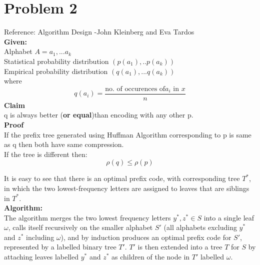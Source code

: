 \documentclass[paper=a4, fontsize=11pt]{scrartcl} %
\numberwithin{equation}{section} %
\numberwithin{figure}{section} %
\numberwithin{table}{section} %
\begin{document}
\section{Problem 2}
Reference: Algorithm Design -John Kleinberg and Eva Tardos\\
\textbf{Given:}\\
Alphabet $A={a_1,...a_k}$\\
Statistical probability distribution $(p(a_1),..p(a_k))$\\
Empirical probability distribution $(q(a_1), ... q(a_k))$\\
where
\begin{equation}
	q(a_i) = \frac{\text{no. of occurences of} a_i \text{ in } x}{n}
\end{equation}
\textbf{Claim}\\
q is always better (\textbf{or equal})than encoding with any other p. \\
\textbf{Proof}\\
If the prefix tree generated using Huffman Algorithm corresponding to p is same as q then both have same compression. \\
If the tree is different then: \\
\begin{equation}
	\rho(q) \leq \rho(p)
\end{equation}

It is easy to see that there is an optimal prefix code, with corresponding tree $T^*$, in which the two lowest-frequency letters are assigned to leaves that are siblings in $T^*$. \\
\textbf{Algorithm:}\\
The algorithm merges the two lowest frequency letters $y^*, z^* \in S$ into a single leaf $\omega$, calls itself recursively on the smaller alphabet $S'$ (all alphabets excluding $y^*$ and $z^*$ including $\omega$), and by induction produces an optimal prefix code for $S'$, represented by a labelled binary tree $T'$. $T'$ is then extended into a tree $T$ for $S$ by attaching leaves labelled $y^*$ and $z^*$ as children of the node in $T'$ labelled $\omega$. \\
\end{document}
